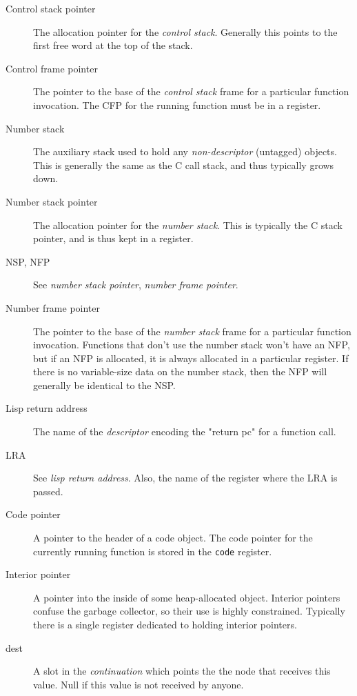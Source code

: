\begin{description}
\item[Control stack pointer] The allocation pointer for the {\it control
stack}.  Generally this points to the first free word at the top of the stack.

\item[Control frame pointer] The pointer to the base of the {\it control stack}
frame for a particular function invocation.  The CFP for the running function
must be in a register.

\item[Number stack] The auxiliary stack used to hold any {\it non-descriptor}
(untagged) objects.  This is generally the same as the C call stack, and thus
typically grows down.

\item[Number stack pointer] The allocation pointer for the {\it number stack}.
This is typically the C stack pointer, and is thus kept in a register.

\item[NSP, NFP] See {\it number stack pointer}, {\it number frame pointer}.

\item[Number frame pointer] The pointer to the base of the {\it number stack}
frame for a particular function invocation.  Functions that don't use the
number stack won't have an NFP, but if an NFP is allocated, it is always
allocated in a particular register.  If there is no variable-size data on the
number stack, then the NFP will generally be identical to the NSP.

\item[Lisp return address] The name of the {\it descriptor} encoding the
"return pc" for a function call.

\item[LRA] See {\it lisp return address}.  Also, the name of the register where
the LRA is passed.


\item[Code pointer] A pointer to the header of a code object.  The code pointer
for the currently running function is stored in the {\tt code} register.

\item[Interior pointer] A pointer into the inside of some heap-allocated
object.  Interior pointers confuse the garbage collector, so their use is
highly constrained.  Typically there is a single register dedicated to holding
interior pointers.

\item[dest]
A slot in the {\it continuation} which points the the node that receives this
value.  Null if this value is not received by anyone.


\end{description}
